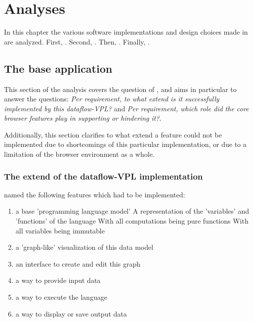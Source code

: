\chapter{Analyses}%
\label{chap:analyses}

In this chapter the various software implementations and design choices made in  are analyzed. 
First, .
Second, .
Then, .
Finally, .

\section{The base application}
\label{sec:analyses:representation}

This section of the analysis covers the question of \mySubRQOneTitle, and aims in particular to answer the questions: \emph{Per requirement, to what extend is it successfully implemented by this dataflow-VPL?} and \emph{Per requirement, which role did the core browser features play in supporting or hindering it?}.

Additionally, this section clarifies to what extend a feature could not be implemented due to shortcomings of this particular implementation, or due to a limitation of the browser environment as a whole. 


\subsection*{The extend of the dataflow-VPL implementation}

 named the following features which had to be implemented:
\begin{enumerate}[-]
  \item a base 'programming language model'
  \subitem A representation of the 'variables' and 'functions' of the language
  \subitem With all computations being pure functions
  \subitem With all variables being immutable
  \item a 'graph-like' visualization of this data model
  \item an interface to create and edit this graph 
  \item a way to provide input data 
  \item a way to execute the language
  \item a way to display or save output data
\end{enumerate}


